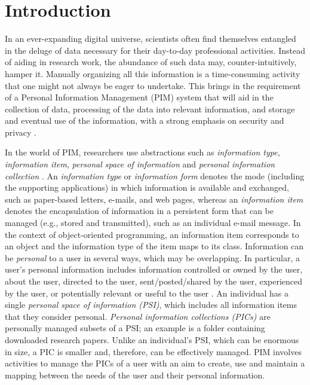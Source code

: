 \documentclass[11pt,pdftex]{article}
\begin{document}
\section{Introduction} \label{prantika_sec:intro}
In an ever-expanding digital universe, scientists often find themselves entangled in the deluge of data necessary for their day-to-day professional activities. Instead of aiding in research work, the abundance of such data may, counter-intuitively, hamper it. Manually organizing all this information is a time-consuming activity that one might not always be eager to undertake. This brings in the requirement of a Personal Information Management (PIM) system that will aid in the collection of data, processing of the data into relevant information, and storage and eventual use of the information, with a strong emphasis on security and privacy \cite{jones2007personal}. 

In the world of PIM, researchers use abstractions such as  \textit{information type}, \textit{information item}, \textit{personal space of information} and \textit{personal information collection}  \cite{jones2017personal,jones2007personal}. An \textit{information type} or \textit{information form} denotes the mode (including the supporting applications) in which information is available and exchanged, such as paper-based letters, e-mails, and web pages, whereas an 
\textit{information item} denotes the encapsulation of  
information in a persistent form that can be managed (e.g., stored and transmitted), such as an individual e-mail message. In the context of object-oriented programming, an information item corresponds to an object and the information type of the item maps to its class. Information can be \textit{personal} to a user in several ways, which may be overlapping. In particular, a user's personal information includes information controlled or owned by the user, about the user, directed to the user, sent/posted/shared by the user, experienced by the user, or potentially relevant or useful to the user \cite{jones2017personal}. An individual has a single \textit{personal space of information (PSI)}, which includes all information items that they consider personal. \textit{Personal information collections (PICs)} are personally managed subsets of a PSI; an example is a folder containing downloaded research papers. Unlike an individual's  PSI, which can be enormous in size, a PIC is smaller and, therefore, can be effectively managed. PIM involves activities to manage the PICs of a user with an aim to create, use and maintain a mapping between the needs of the user and their personal information.  
\end{document}
